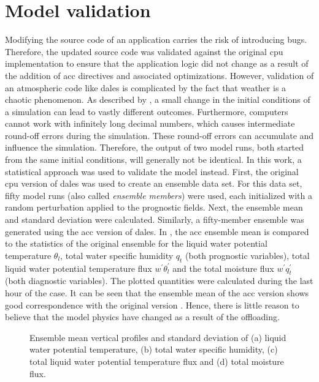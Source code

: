 \section{Model validation}
Modifying the source code of an application carries the risk of introducing bugs. Therefore, the updated source code was validated against the original \acrshort{cpu} implementation to ensure that the application logic did not change as a result of the addition of \acrshort{acc} directives and associated optimizations. However, validation of an atmospheric code like \acrshort{dales} is complicated by the fact that weather is a chaotic phenomenon. As described by \citet{lorenzDeterministicNonperiodicFlow1963}, a small change in the initial conditions of a simulation can lead to vastly different outcomes. Furthermore, computers cannot work with infinitely long decimal numbers, which causes intermediate round-off errors during the simulation. These round-off errors can accumulate and influence the simulation. Therefore, the output of two model runs, both started from the same initial conditions, will generally not be identical. In this work, a statistical approach was used to validate the model instead. First, the original \acrshort{cpu} version of \acrshort{dales} was used to create an ensemble data set. For this data set, fifty model runs (also called \emph{ensemble members}) were used, each initialized with a random perturbation applied to the prognostic fields. Next, the ensemble mean and standard deviation were calculated. Similarly, a fifty-member ensemble was generated using the \acrshort{acc} version of \acrshort{dales}. In , the \acrshort{acc} ensemble mean is compared to the statistics of the original ensemble for the liquid water potential temperature $\theta_l$, total water specific humidity $q_t$ (both prognostic variables), total liquid water potential temperature flux $w^\prime \theta_l^\prime$ and the total moisture flux $w^\prime q_t^\prime$ (both diagnostic variables). The plotted quantities were calculated during the last hour of the case. It can be seen that the ensemble mean of the \acrshort{acc} version shows good correspondence with the original version . Hence, there is little reason to believe that the model physics have changed as a result of the offloading.

\begin{figure}
    \centering
    
    \caption{Ensemble mean vertical profiles and standard deviation of (a) liquid water potential temperature, (b) total water specific humidity, (c) total liquid water potential temperature flux and (d) total moisture flux.}
    \label{fig:validation}
\end{figure} 

